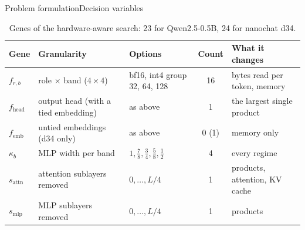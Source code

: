 \documentclass[aspectratio=169,10pt]{beamer}
\begin{document}
\begin{frame}{Problem formulation}{Decision variables}
\begin{table}
\centering
\begin{adjustbox}{width=\linewidth, totalheight=0.64\textheight, keepaspectratio, center}
\centering
\small
\begin{tabular}{P{1.6cm}P{3.6cm}P{3.6cm}cP{3.6cm}}
\toprule
Gene & Granularity & Options & Count & What it changes \\
\midrule
$f_{r,b}$ & role $\times$ band ($4\times4$) & bf16, int4 group 32, 64, 128 & 16 & bytes read per token, memory \\
$f_{\text{head}}$ & output head (with a tied embedding) & as above & 1 & the largest single product \\
$f_{\text{emb}}$ & untied embeddings (d34 only) & as above & 0 (1) & memory only \\
$\kappa_b$ & MLP width per band & $1, \tfrac78, \tfrac34, \tfrac58, \tfrac12$ & 4 & every regime \\
$s_{\text{attn}}$ & attention sublayers removed & $0,\dots,L/4$ & 1 & products, attention, KV cache \\
$s_{\text{mlp}}$ & MLP sublayers removed & $0,\dots,L/4$ & 1 & products \\
\bottomrule
\end{tabular}
\end{adjustbox}
\caption{Genes of the hardware-aware search: 23 for Qwen2.5-0.5B, 24 for nanochat d34.}\label{tab:genes}
\end{table}
\end{frame}
\end{document}
